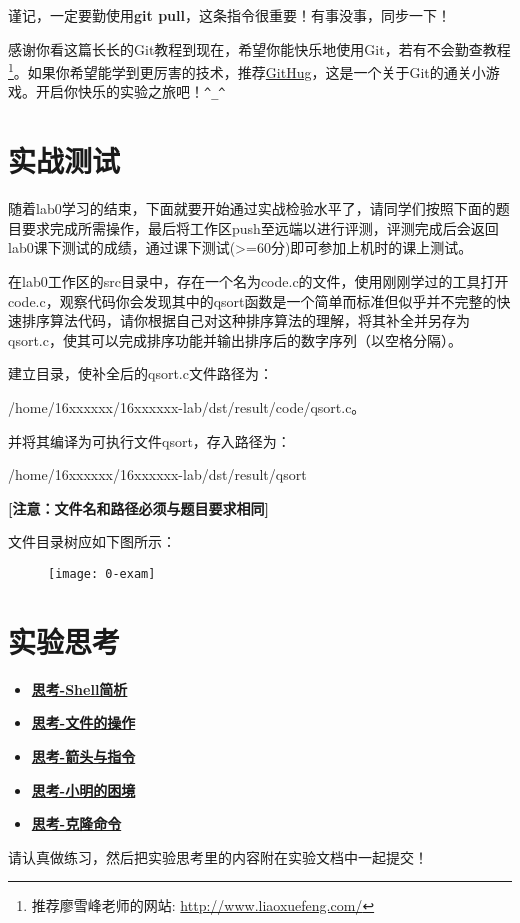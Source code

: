 谨记，一定要勤使用\textbf{git pull}，这条指令很重要！有事没事，同步一下！

感谢你看这篇长长的Git教程到现在，希望你能快乐地使用Git，若有不会勤查教程\footnote{推荐廖雪峰老师的网站:
\url{http://www.liaoxuefeng.com/}}。如果你希望能学到更厉害的技术，推荐\href{https://github.com/Gazler/githug}{GitHug}，这是一个关于Git的通关小游戏。开启你快乐的实验之旅吧！\verb|^_^|

\section{实战测试}
随着lab0学习的结束，下面就要开始通过实战检验水平了，请同学们按照下面的题目要求完成所需操作，最后将工作区push至远端以进行评测，评测完成后会返回lab0课下测试的成绩，通过课下测试(>=60分)即可参加上机时的课上测试。
\begin{exercise}
在lab0工作区的src目录中，存在一个名为code.c的文件，使用刚刚学过的工具打开code.c，观察代码你会发现其中的qsort函数是一个简单而标准但似乎并不完整的快速排序算法代码，请你根据自己对这种排序算法的理解，将其补全并另存为qsort.c，使其可以完成排序功能并输出排序后的数字序列（以空格分隔）。

建立目录，使补全后的qsort.c文件路径为：

/home/16xxxxxx/16xxxxxx-lab/dst/result/code/qsort.c。

并将其编译为可执行文件qsort，存入路径为：

/home/16xxxxxx/16xxxxxx-lab/dst/result/qsort

\textbf{[注意：文件名和路径必须与题目要求相同]}

文件目录树应如下图所示：
\end{exercise}
\begin{figure}[htbp]
  \centering
  \texttt{[image: 0-exam]}
\end{figure}

\section{实验思考}
\begin{itemize}
\item \hyperref[think-Shell简析]{\textbf{\textcolor{baseB}{思考-Shell简析}}}
\item \hyperref[think-文件的操作]{\textbf{\textcolor{baseB}{思考-文件的操作}}}
\item \hyperref[think-箭头与指令]{\textbf{\textcolor{baseB}{思考-箭头与指令}}}
\item \hyperref[think-小明的困境]{\textbf{\textcolor{baseB}{思考-小明的困境}}}
\item \hyperref[think-克隆]{\textbf{\textcolor{baseB}{思考-克隆命令}}}
\end{itemize}

请认真做练习，然后把实验思考里的内容附在实验文档中一起提交！
